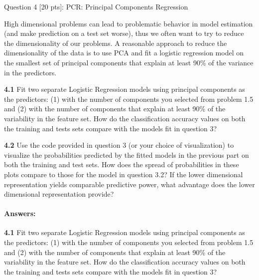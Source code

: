 \documentclass[11pt]{article}
\begin{document}
     Question 4 {[}20 pts{]}: PCR: Principal Components Regression

High dimensional problems can lead to problematic behavior in model
estimation (and make prediction on a test set worse), thus we often want
to try to reduce the dimensionality of our problems. A reasonable
approach to reduce the dimensionality of the data is to use PCA and fit
a logistic regression model on the smallest set of principal components
that explain at least 90\% of the variance in the predictors.

\textbf{4.1} Fit two separate Logistic Regression models using principal
components as the predictors: (1) with the number of components you
selected from problem 1.5 and (2) with the number of components that
explain at least 90\% of the variability in the feature set. How do the
classification accuracy values on both the training and tests sets
compare with the models fit in question 3?

\textbf{4.2} Use the code provided in question 3 (or your choice of
visualization) to visualize the probabilities predicted by the fitted
models in the previous part on both the training and test sets. How does
the spread of probabilities in these plots compare to those for the
model in question 3.2? If the lower dimensional representation yields
comparable predictive power, what advantage does the lower dimensional
representation provide?

    \paragraph{Answers:}\label{answers}

\textbf{4.1} Fit two separate Logistic Regression models using principal
components as the predictors: (1) with the number of components you
selected from problem 1.5 and (2) with the number of components that
explain at least 90\% of the variability in the feature set. How do the
classification accuracy values on both the training and tests sets
compare with the models fit in question 3?
\end{document}
